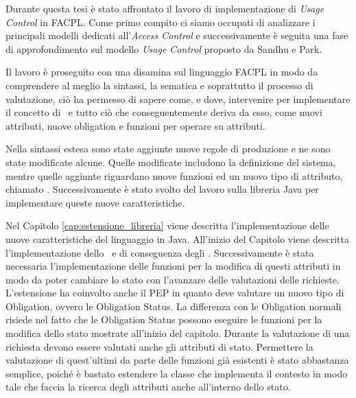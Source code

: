 \label{cap:conclusioni}
Durante questa tesi è stato affrontato il lavoro di implementazione di \textit{Usage Control} in \ac{FACPL}.
Come primo compito ci siamo occupati di analizzare i principali modelli dedicati all'\textit{Access Control} e successivamente è seguita una fase di approfondimento sul modello \textit{Usage Control} proposto da Sandhu e Park.  \par
Il lavoro è proseguito con una disamina sul linguaggio \ac{FACPL} in modo da comprendere al meglio la sintassi, la sematica e soprattutto il processo di valutazione, ciò ha permesso di sapere come, e dove, intervenire per implementare il concetto di \status \ e tutto ciò che conseguentemente deriva da esso, come nuovi attributi, nuove obligation e funzioni per operare su attributi. \par
Nella sintassi estesa sono state aggiunte nuove regole di produzione e ne sono state modificate alcune. Quelle modificate includono la definizione del sistema, mentre quelle aggiunte riguardano nuove funzioni ed un nuovo tipo di attributo, chiamato \statusattribute.
Successivamente è stato svolto del lavoro sulla libreria Java per implementare queste nuove caratteristiche. \par
Nel Capitolo \ref{cap:estensione_libreria} viene descritta l'implementazione delle nuove caratteristiche del linguaggio in Java. All'inizio del Capitolo viene descritta l'implementazione dello \status \ e di conseguenza degli \statusattribute. Successivamente è stata necessaria  l'implementazione  delle funzioni per la modifica di questi attributi in modo da poter cambiare lo stato con l'avanzare delle valutazioni delle richieste. L'estensione ha coinvolto anche il \ac{PEP} in quanto deve valutare un nuovo tipo di Obligation, ovvero le Obligation Status.
La differenza con le Obligation normali risiede nel fatto che le Obligation Status possono eseguire le funzioni per la modifica dello stato mostrate all'inizio del capitolo.
Durante la valutazione di una richiesta devono essere valutati anche gli attributi di stato. Permettere la valutazione di quest'ultimi da parte delle funzioni già esistenti è stato abbastanza semplice, poiché è bastato estendere la classe che implementa il contesto in modo tale che faccia la ricerca degli attributi anche all'interno dello stato.\par
